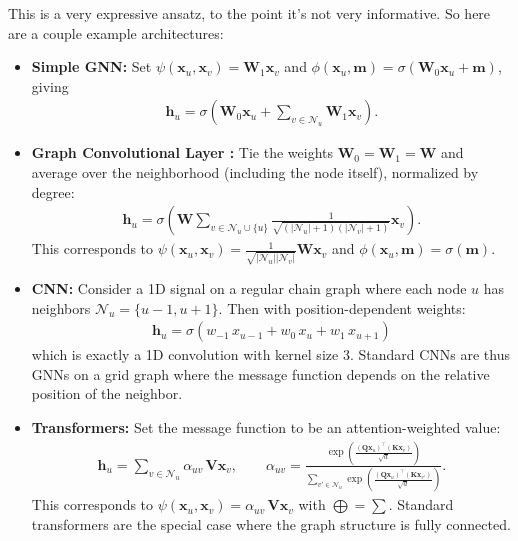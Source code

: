 This is a very expressive ansatz, to the point it's not very informative. So here are a couple example architectures:
\begin{itemize}
	\item \textbf{Simple GNN:} Set $\psi(\mathbf x_u, \mathbf x_v) = \mathbf W_1 \mathbf x_v$ and $\phi(\mathbf x_u, \mathbf m) = \sigma(\mathbf W_0 \mathbf x_u + \mathbf m)$, giving
	\begin{align}
		\mathbf h_u = \sigma\!\left(\mathbf W_0 \mathbf x_u + \sum_{v \in \mathcal N_u} \mathbf W_1 \mathbf x_v\right).
	\end{align}

	\item \textbf{Graph Convolutional Layer \cite{graphcnn}:} Tie the weights $\mathbf W_0 = \mathbf W_1 = \mathbf W$ and average over the neighborhood (including the node itself), normalized by degree:
	\begin{align}
		\mathbf h_u = \sigma\!\left(\mathbf W \sum_{v \in \mathcal N_u \cup \{u\}} \frac{1}{\sqrt{(|\mathcal N_u| + 1
	)(|\mathcal N_v| + 1)}} \mathbf x_v\right).
	\end{align}
	This corresponds to $\psi(\mathbf x_u, \mathbf x_v) = \frac{1}{\sqrt{|\mathcal N_u||\mathcal N_v|}} \mathbf W \mathbf x_v$ and $\phi(\mathbf x_u, \mathbf m) = \sigma(\mathbf m)$.

	\item \textbf{CNN:} Consider a 1D signal on a regular chain graph where each node $u$ has neighbors $\mathcal N_u = \{u-1, u+1\}$. Then with position-dependent weights:
	\begin{align}
		\mathbf h_u = \sigma\!\left(w_{-1}\, x_{u-1} + w_0\, x_u + w_1\, x_{u+1}\right)
	\end{align}
	which is exactly a 1D convolution with kernel size 3. Standard CNNs are thus GNNs on a grid graph where the message function depends on the relative position of the neighbor.

	\item \textbf{Transformers:} Set the message function to be an attention-weighted value:
	\begin{align}
		\mathbf h_u = \sum_{v \in \mathcal N_u} \alpha_{uv}\, \mathbf V \mathbf x_v, \qquad \alpha_{uv} = \frac{\exp\!\left(\frac{(\mathbf Q \mathbf x_u)^\top (\mathbf K \mathbf x_v)}{\sqrt{d}}\right)}{\sum_{v' \in \mathcal N_u} \exp\!\left(\frac{(\mathbf Q \mathbf x_u)^\top (\mathbf K \mathbf x_{v'})}{\sqrt{d}}\right)}.
	\end{align}
	This corresponds to $\psi(\mathbf x_u, \mathbf x_v) = \alpha_{uv}\, \mathbf V \mathbf x_v$ with $\bigoplus = \sum$. Standard transformers are the special case where the graph structure is fully connected.
\end{itemize}


